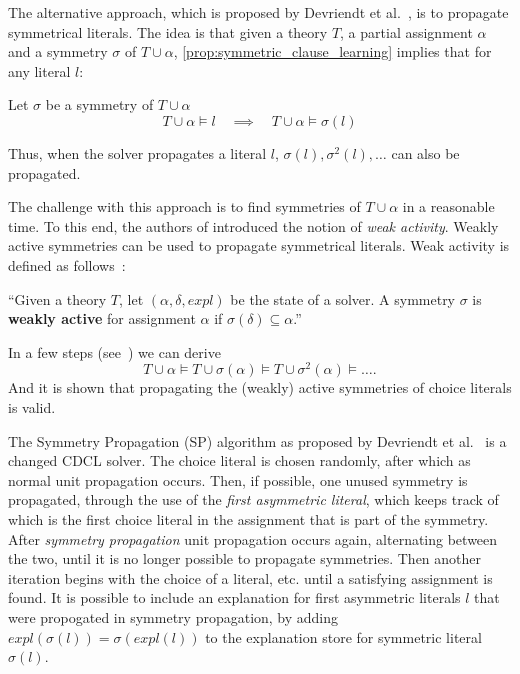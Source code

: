 	The alternative approach, which is proposed by Devriendt et al.~\cite{devriendt2012symmetry},
	is to propagate symmetrical literals.
	The idea is that given a theory $T$, a partial assignment $\alpha$ and a symmetry
	$\sigma$ of $T \cup \alpha$, \cref{prop:symmetric_clause_learning} implies
	that for any literal $l$:\\
	
	\begin{proposition}
		\label{prop:symmetryPropagation}
		Let $\sigma$ be a symmetry of $T \cup \alpha$
		\begin{equation*}
			T \cup \alpha \models l \quad
			\implies
			\quad T \cup \alpha \models \sigma(l)
		\end{equation*}
	\end{proposition}
	Thus, when the solver propagates a literal $l$, $\sigma(l), \sigma^2(l),\dots$ can also be propagated.

	The challenge with this approach is to find symmetries of $T \cup \alpha$ in a
	reasonable time.
	To this end, the authors of \cite{devriendt2012symmetry} introduced the notion of
	\emph{weak activity}.
	Weakly active symmetries can be used to propagate symmetrical literals.
	Weak activity is defined as follows~\cite{devriendt2012symmetry}:
	\begin{definition}
		\label{def:weaklyActive}
		``Given a theory $T$, let $(\alpha, \delta, expl)$ be the state of a solver.
		A symmetry $\sigma$ is \textbf{weakly active} for  assignment $\alpha$ if
		$\sigma(\delta)\subseteq \alpha$.''
	\end{definition}
	In a few steps (see~\cite{devriendt2012symmetry}) we can derive
	\begin{equation}
		T\cup \alpha \models T \cup \sigma(\alpha) \models T \cup \sigma^2(\alpha) \models \dots.
	\end{equation}
	And it is shown that propagating the (weakly) active symmetries of choice literals is valid.
	
	The Symmetry Propagation (SP) algorithm as proposed by Devriendt et al.~\cite{devriendt2012symmetry} is a changed CDCL solver.
	The choice literal is chosen randomly, after which as normal unit propagation occurs.
	Then, if possible, one unused symmetry is propagated,
	through the use of the \emph{first asymmetric literal},
	which keeps track of which is the first choice literal in the assignment that is part of the symmetry.
	After \emph{symmetry propagation} unit propagation occurs again, alternating between the two,
	until it is no longer possible to propagate symmetries.
	Then another iteration begins with the choice of a literal, etc. until a satisfying assignment is found.
	It is possible to include an explanation for first asymmetric literals $l$ that were propogated in symmetry propagation,
	by adding $expl(\sigma(l)) = \sigma(expl(l))$ to the explanation store for symmetric literal $\sigma(l)$.
	
